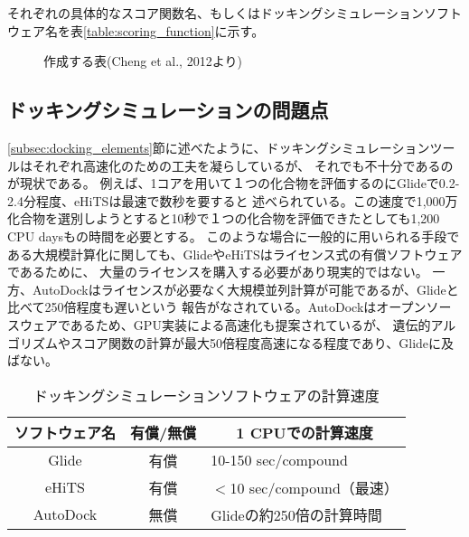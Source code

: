 それぞれの具体的なスコア関数名、もしくはドッキングシミュレーションソフトウェア名を表\ref{table:scoring_function}に示す。
\begin{figure}[h]
 \begin{center}
  \caption{作成する表(Cheng et al., 2012より)}
  \label{fig:scoring_function}
 \end{center}
\end{figure}

\subsection{ドッキングシミュレーションの問題点}\label{subsec:docking_problem}
\ref{subsec:docking_elements}節に述べたように、ドッキングシミュレーションツールはそれぞれ高速化のための工夫を凝らしているが、
それでも不十分であるのが現状である。
例えば、1コアを用いて１つの化合物を評価するのにGlideで0.2-2.4分程度\cite{Friesner2004}、eHiTSは最速で数秒\cite{Zsoldos2007}を要すると
述べられている。この速度で1,000万化合物を選別しようとすると10秒で１つの化合物を評価できたとしても1,200 CPU daysもの時間を必要とする。
このような場合に一般的に用いられる手段である大規模計算化に関しても、GlideやeHiTSはライセンス式の有償ソフトウェアであるために、
大量のライセンスを購入する必要があり現実的ではない。
一方、AutoDockはライセンスが必要なく大規模並列計算が可能であるが、Glideと比べて250倍程度も遅いという
報告がなされている\cite{Tuccinardi2010}。AutoDockはオープンソースウェアであるため、GPU実装による高速化も提案されているが、
遺伝的アルゴリズムやスコア関数の計算が最大50倍程度高速になる程度であり\cite{Kannan2010}、Glideに及ばない。

\begin{table}[htb] \centering
	\caption{ドッキングシミュレーションソフトウェアの計算速度}
	\label{table:docking_tools}
	\begin{tabular}{c|cl}
	\hline
	ソフトウェア名					&有償/無償				&\multicolumn{1}{c}{1 CPUでの計算速度} 					\\ \hline
	Glide							&有償						&10-150 sec/compound\cite{Friesner2004}				\\
	eHiTS							&有償						&$<$10 sec/compound（最速）\cite{Zsoldos2007}			\\
	AutoDock					&無償						&Glideの約250倍の計算時間\cite{Tuccinardi2010}		\\ \hline
	\end{tabular}
\end{table}

